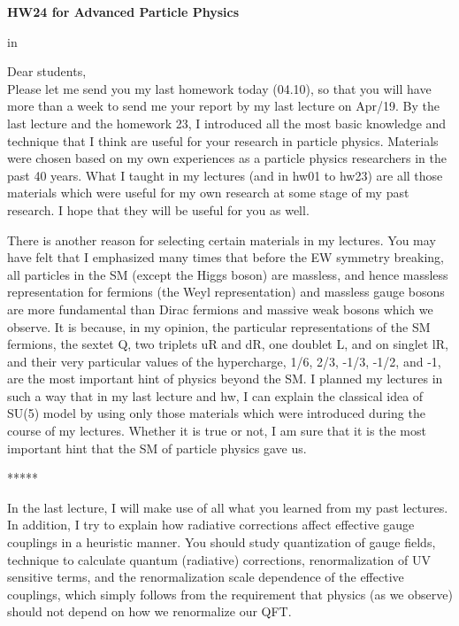 \documentclass[12pt]{article}
\begin{document}
\begin{center}
{\large\bf HW24 for Advanced Particle Physics} \\
  
\end{center}

 in

Dear students,\\

Please let me send you my last homework today (04.10), so that you will
have more than a week to send me your report by my last lecture on
Apr/19.  By the last lecture and the homework 23, I introduced all the
most basic knowledge and technique that I think are useful for your
research in particle physics.  Materials were chosen based on my own
experiences as a particle physics researchers in the past 40 years.
What I taught in my lectures (and in hw01 to hw23) are all those
materials which were useful for my own research at some stage of my
past research.  I hope that they will be useful for you as well.

There is another reason for selecting certain materials in my lectures.
You may have felt that I emphasized many times that before the EW
symmetry breaking, all particles in the SM (except the Higgs boson)
are massless, and hence massless representation for fermions (the
Weyl representation) and massless gauge bosons are more fundamental
than Dirac fermions and massive weak bosons which we observe.  It is
because, in my opinion, the particular representations of the SM
fermions, the sextet Q, two triplets uR and dR, one doublet L, and
on singlet lR, and their very particular values of the hypercharge,
1/6, 2/3, -1/3, -1/2, and -1, are the most important hint of physics
beyond the SM.  I planned my lectures in such a way that in my last
lecture and hw, I can explain the classical idea of SU(5) model by
using only those materials which were introduced during the course
of my lectures.  Whether it is true or not, I am sure that it is the
most important hint that the SM of particle physics gave us.

                               *****

In the last lecture, I will make use of all what you learned from my
past lectures.  In addition, I try to explain how radiative corrections
affect effective gauge couplings in a heuristic manner.  You should
study quantization of gauge fields, technique to calculate quantum
(radiative) corrections, renormalization of UV sensitive terms, and
the renormalization scale dependence of the effective couplings,
which simply follows from the requirement that physics (as we observe)
should not depend on how we renormalize our QFT.
\end{document}

